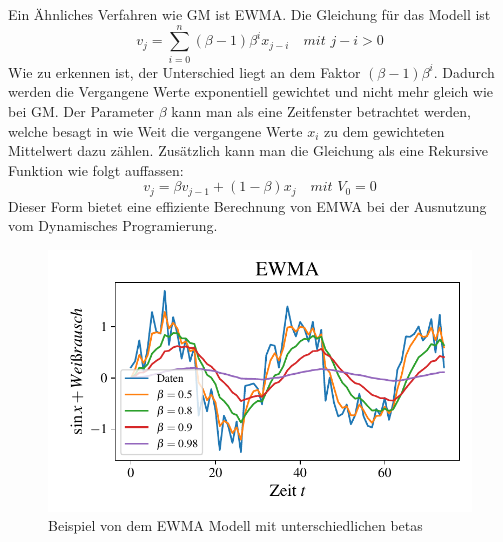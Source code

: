 \begin{itemize}
  Ein Ähnliches Verfahren wie GM ist EWMA. Die Gleichung für das Modell ist
  \[
    v_j = \sum_{i=0}^{n}(\beta-1)\beta^{i}x_{j-i}\quad mit\,\,j-i>0
  \]
  Wie zu erkennen ist, der Unterschied liegt an dem Faktor
  $(\beta-1)\beta^{i}$. Dadurch werden die Vergangene Werte exponentiell
  gewichtet  und nicht mehr gleich wie bei GM. Der Parameter $\beta$ kann man
  als eine Zeitfenster betrachtet werden, welche besagt in wie Weit die
  vergangene Werte $x_i$ zu dem gewichteten Mittelwert dazu zählen. Zusätzlich
  kann man die Gleichung als eine Rekursive Funktion wie folgt auffassen:
  \[
   v_j = \beta v_{j-1} + (1-\beta)x_j \quad mit\,\, V_0=0
  \]
  Dieser Form bietet eine effiziente Berechnung von EMWA bei der Ausnutzung vom
  Dynamisches Programierung.
\begin{figure}[h]
      \centering
      \includegraphics[width=\textwidth,keepaspectratio]{../plots/EWMA.pdf}
      \caption{Beispiel von dem EWMA Modell mit unterschiedlichen betas}
      \label{fig:ewma}
    \end{figure}

 \end{itemize}

